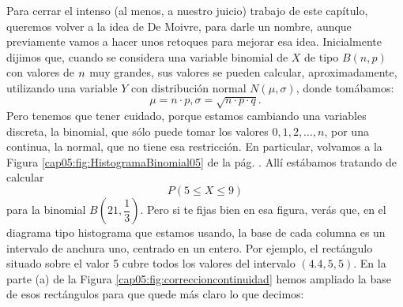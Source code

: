Para cerrar el intenso (al menos, a nuestro juicio) trabajo de este capítulo, queremos volver a la idea de De Moivre, para darle un nombre, aunque previamente vamos a hacer unos retoques para mejorar esa idea. Inicialmente dijimos que, cuando se considera una variable binomial de $X$ de tipo $B(n,p)$ con valores de $n\emph{}$ muy grandes, sus valores se pueden calcular, aproximadamente, utilizando una variable $Y$ con distribución normal $N(\mu,\sigma)$, donde tomábamos:
    \[\mu=n\cdot p,\sigma=\sqrt{n\cdot p\cdot q}.\]
Pero tenemos que tener cuidado, porque estamos cambiando una variables discreta, la binomial, que sólo puede tomar los valores $0,1,2,\ldots,n$, por una continua, la normal, que no tiene esa restricción. En particular, volvamos a la Figura \ref{cap05:fig:HistogramaBinomial05} de la pág. \pageref{cap05:fig:HistogramaBinomial05}. Allí estábamos tratando de calcular
\[P(5\leq X\leq 9)\]
para la binomial $B\left(21,\dfrac{1}{3}\right)$. Pero si te fijas bien en esa figura, verás que, en el diagrama tipo histograma que estamos usando, la base de cada columna es un intervalo de anchura uno, centrado en un entero. Por ejemplo, el rectángulo situado sobre el valor 5 cubre todos los valores del intervalo $(4.4,5,5)$. En la parte (a) de la Figura \ref{cap05:fig:correccioncontinuidad} hemos ampliado la base de esos rectángulos para que quede más claro lo que decimos:

